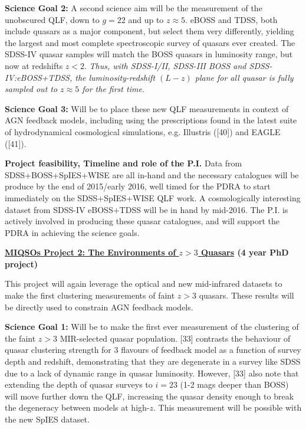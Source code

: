 \documentclass[oneside, a4paper, onecolumn, 11pt]{article}
\begin{document}
\smallskip
\smallskip
\noindent
{\bf Science Goal 2:}
A second science aim will be the measurement of the unobscured QLF,
down to $g=22$ and up to $z\approx5$.  eBOSS and TDSS, both include
quasars as a major component, but select them very differently,
yielding the largest and most complete spectroscopic survey of quasars
ever created.  The SDSS-IV quasar samples will match the BOSS quasars
in luminosity range, but now at redshifts $z<2$. {\it Thus, with SDSS-I/II, SDSS-III BOSS
and SDSS-IV:eBOSS+TDSS, the luminosity-redshift $(L - z)$ plane for all quasar
is fully sampled out to $z\approx5$ for the first time. }

\smallskip
\smallskip
\noindent
{\bf Science Goal 3:}
Will be to place these new QLF measurements in context of AGN feedback
models, including using the prescriptions found in the latest suite of
hydrodynamical cosmological simulations, e.g. Illustris ([40]) and
EAGLE ([41]).

\smallskip
\smallskip
\noindent
{\bf Project feasibility, Timeline and role of the P.I.}
Data from SDSS+BOSS+SpIES+WISE are all in-hand and the necessary catalogues will 
be produce by the end of 2015/early 2016, well timed for the PDRA to 
start immediately on the SDSS+SpIES+WISE QLF work. 
A cosmologically interesting dataset from SDSS-IV eBOSS+TDSS 
will be in hand by mid-2016. The P.I. is actively involved in 
producing these quasar catalogues, and will support the PDRA in achieving the science goals. 

\medskip
\medskip


\smallskip
\smallskip
\noindent
{\bf  \underline{\large MIQSOs Project 2: The Environments of $z>3$ Quasars} (4 year PhD project)}

\smallskip
\noindent
This project will again leverage the optical and new mid-infrared
datasets to make the first clustering measurements of faint $z>3$
quasars. These results will be directly used to constrain AGN feedback
models.

\smallskip
\smallskip
\noindent
{\bf Science Goal 1:}
Will be to make the first ever measurement of the clustering of the faint $z>3$ MIR-selected quasar population. 
[33] contrasts the behaviour of quasar clustering strength for 3
flavours of feedback model as a function of survey depth and redshift,
demonstrating that they are degenerate in a survey like SDSS due to a
lack of dynamic range in quasar luminosity. However, [33] also note that
extending the depth of quasar surveys to $i=23$ (1-2 mags deeper than
BOSS) will move further down the QLF, increasing the quasar density
enough to break the degeneracy between models at high-$z$.
This measurement will be possible with the new SpIES dataset. 
\end{document}
